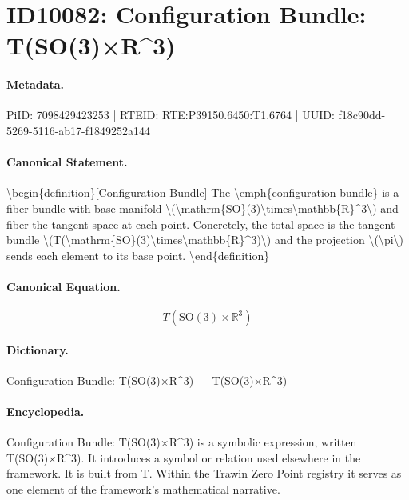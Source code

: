 \section*{ID10082: Configuration Bundle: T(SO(3)×R\textasciicircum{}3)}
\paragraph{Metadata.}
PiID: 7098429423253 | RTEID: RTE:P39150.6450:T1.6764 | UUID: f18c90dd-5269-5116-ab17-f1849252a144

\paragraph{Canonical Statement.}
\textbackslash{}begin\{definition\}[Configuration Bundle] The \textbackslash{}emph\{configuration bundle\} is a fiber bundle with base manifold \textbackslash{}(\textbackslash{}mathrm\{SO\}(3)\textbackslash{}times\textbackslash{}mathbb\{R\}\textasciicircum{}3\textbackslash{}) and fiber the tangent space at each point. Concretely, the total space is the tangent bundle \textbackslash{}(T(\textbackslash{}mathrm\{SO\}(3)\textbackslash{}times\textbackslash{}mathbb\{R\}\textasciicircum{}3)\textbackslash{}) and the projection \textbackslash{}(\textbackslash{}pi\textbackslash{}) sends each element to its base point. \textbackslash{}end\{definition\}

\paragraph{Canonical Equation.}
\[
T(\mathrm{SO}(3)\times\mathbb{R}^3)
\]

\paragraph{Dictionary.}
Configuration Bundle: T(SO(3)×R\textasciicircum{}3) — T(SO(3)×R\textasciicircum{}3)

\paragraph{Encyclopedia.}
Configuration Bundle: T(SO(3)×R\textasciicircum{}3) is a symbolic expression, written T(SO(3)×R\textasciicircum{}3). It introduces a symbol or relation used elsewhere in the framework. It is built from T. Within the Trawin Zero Point registry it serves as one element of the framework's mathematical narrative.
